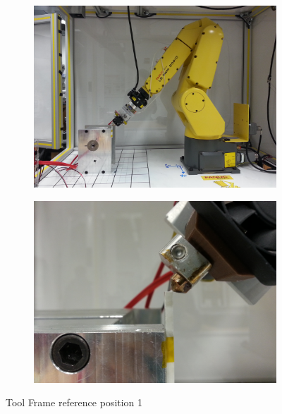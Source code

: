 \begin{figure}
    \centering
    \begin{subfigure}{.5\textwidth}
        \centering
            \includegraphics[width=.8\linewidth]{figures/tool-pt-1}
    \end{subfigure}%
    \begin{subfigure}{.5\textwidth}
        \centering
        \includegraphics[width=.8\linewidth]{figures/tool-pt-1-close}
    \end{subfigure}
    \caption{Tool Frame reference position 1}
    \label{fig:tool-pt-1}
\end{figure}


